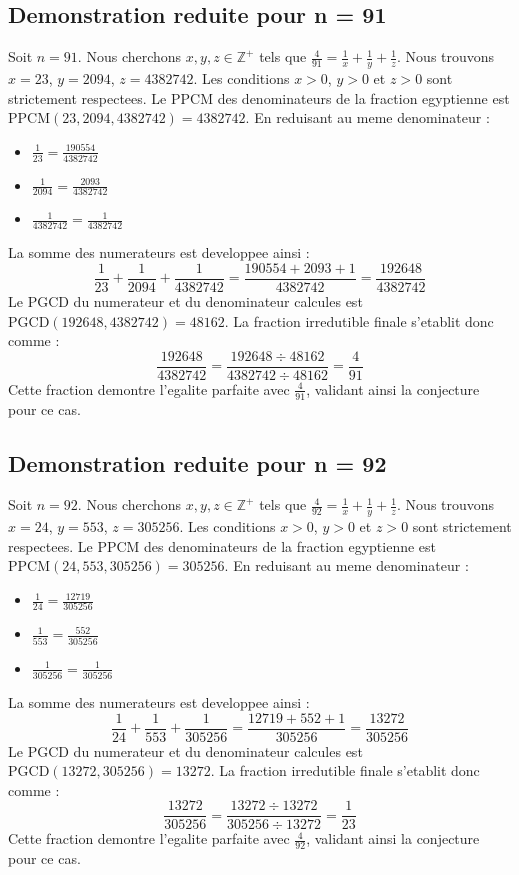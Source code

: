 \documentclass[11pt,a4paper]{article}
\begin{document}
\subsection{Demonstration reduite pour n = 91}
Soit $n = 91$. Nous cherchons $x, y, z \in \mathbb{Z}^{+}$ tels que $\frac{4}{91} = \frac{1}{x} + \frac{1}{y} + \frac{1}{z}$.
Nous trouvons $x = 23$, $y = 2094$, $z = 4382742$.
Les conditions $x > 0$, $y > 0$ et $z > 0$ sont strictement respectees.
Le PPCM des denominateurs de la fraction egyptienne est $\text{PPCM}(23, 2094, 4382742) = 4382742$.
En reduisant au meme denominateur :
\begin{itemize}
    \item $\frac{1}{23} = \frac{190554}{4382742}$
    \item $\frac{1}{2094} = \frac{2093}{4382742}$
    \item $\frac{1}{4382742} = \frac{1}{4382742}$
\end{itemize}
La somme des numerateurs est developpee ainsi :
$$ \frac{1}{23} + \frac{1}{2094} + \frac{1}{4382742} = \frac{190554 + 2093 + 1}{4382742} = \frac{192648}{4382742} $$
Le PGCD du numerateur et du denominateur calcules est $\text{PGCD}(192648, 4382742) = 48162$.
La fraction irredutible finale s'etablit donc comme :
$$ \frac{192648}{4382742} = \frac{192648 \div 48162}{4382742 \div 48162} = \frac{4}{91} $$
Cette fraction demontre l'egalite parfaite avec $\frac{4}{91}$, validant ainsi la conjecture pour ce cas.

\subsection{Demonstration reduite pour n = 92}
Soit $n = 92$. Nous cherchons $x, y, z \in \mathbb{Z}^{+}$ tels que $\frac{4}{92} = \frac{1}{x} + \frac{1}{y} + \frac{1}{z}$.
Nous trouvons $x = 24$, $y = 553$, $z = 305256$.
Les conditions $x > 0$, $y > 0$ et $z > 0$ sont strictement respectees.
Le PPCM des denominateurs de la fraction egyptienne est $\text{PPCM}(24, 553, 305256) = 305256$.
En reduisant au meme denominateur :
\begin{itemize}
    \item $\frac{1}{24} = \frac{12719}{305256}$
    \item $\frac{1}{553} = \frac{552}{305256}$
    \item $\frac{1}{305256} = \frac{1}{305256}$
\end{itemize}
La somme des numerateurs est developpee ainsi :
$$ \frac{1}{24} + \frac{1}{553} + \frac{1}{305256} = \frac{12719 + 552 + 1}{305256} = \frac{13272}{305256} $$
Le PGCD du numerateur et du denominateur calcules est $\text{PGCD}(13272, 305256) = 13272$.
La fraction irredutible finale s'etablit donc comme :
$$ \frac{13272}{305256} = \frac{13272 \div 13272}{305256 \div 13272} = \frac{1}{23} $$
Cette fraction demontre l'egalite parfaite avec $\frac{4}{92}$, validant ainsi la conjecture pour ce cas.
\end{document}
